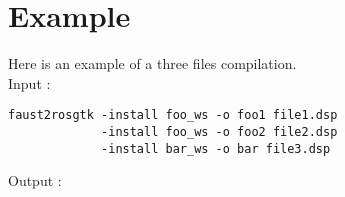 %

\section{Example}
Here is an example of a three files compilation.\\

Input :
\begin{lstlisting}
faust2rosgtk -install foo_ws -o foo1 file1.dsp 
			 -install foo_ws -o foo2 file2.dsp 
			 -install bar_ws -o bar file3.dsp
\end{lstlisting}

Output :\\
